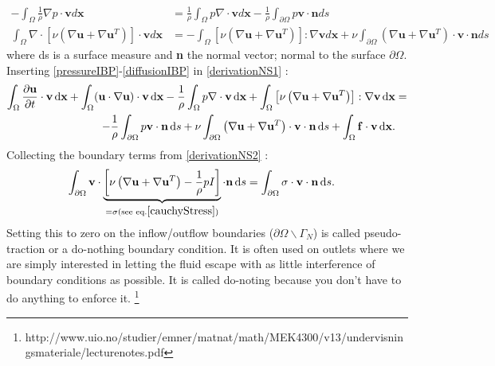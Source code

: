 \documentclass[11pt]{article}
\begin{document}
{\begin{align}
\label{pressureIBP}
-\int_\Omega \frac{1}{\rho}  \nabla p \cdot \mathbf{v} d\mathbf{x} &=
\frac{1}{\rho}\int_\Omega p\nabla \cdot \mathbf{v} d\mathbf{x} 
- \frac{1}{\rho} \int_{\partial\Omega} p \mathbf{v \cdot n} ds \\
\label{diffusionIBP}
\int_\Omega \nabla \cdot \left[\nu \left(\nabla\mathbf{u} + \nabla\mathbf{u}^T \right)  
\right] \cdot \mathbf{v} d\mathbf{x} &=
-\int_\Omega \left[\nu \left(\nabla\mathbf{u} + \nabla\mathbf{u}^T \right)  
\right] : \nabla\mathbf{v} d\mathbf{x} 
+ \nu \int_{\partial \Omega} \left(\nabla\mathbf{u} + \nabla\mathbf{u}^T \right) \cdot 
\mathbf{v} \cdot \mathbf{n} ds 
\end{align}
where ds is a surface measure and \textbf{n} the normal vector; normal to the surface 
$\partial \Omega$. Inserting \eqref{pressureIBP}-\eqref{diffusionIBP} in \eqref{derivationNS1} :
\begin{align}
\label{derivationNS2}
\int_\Omega\frac{\partial\mathbf{u}}{\partial t} \cdot \mathbf{v}\,\mathrm d\mathbf{x}
+ \int_\Omega (\mathbf{u}\cdot\nabla \mathbf{u}) \cdot \mathbf{v}\,\mathrm d\mathbf{x}
- \frac{1}{\rho}\int_\Omega  p\nabla \cdot \mathbf{v}\,\mathrm d\mathbf{x} 
+ \int_\Omega \left[\nu \left(\nabla\mathbf{u} + \nabla\mathbf{u}^T \right)  
\right] : \nabla \mathbf{v}\,\mathrm d\mathbf{x}
&=  \\ \notag
- \frac{1}{\rho} \int_{\partial\Omega} p \mathbf{v \cdot n}\,\mathrm ds
+ \nu \int_{\partial \Omega} \left(\nabla\mathbf{u} + \nabla\mathbf{u}^T \right) \cdot 
\mathbf{v} \cdot \mathbf{n}\,\mathrm ds 
+ \int_\Omega \mathbf{f} \cdot \mathbf{v}\,\mathrm d\mathbf{x}.
\end{align}
Collecting the boundary terms from \eqref{derivationNS2} :
\begin{align}
\label{weakBoundary}
\int_{\partial\Omega}
\mathbf{v} \cdot \underbrace{\left[
\nu \left(\nabla\mathbf{u} + \nabla\mathbf{u}^T \right) 
- \frac{1}{\rho} p I \right]}_{= \sigma (\text{see eq.} \eqref{cauchyStress})}
 \cdot\mathbf{n}\,\mathrm ds 
&= \int_{\partial\Omega} \mathbf{\sigma \cdot v \cdot n}\,\mathrm ds.
\end{align}
Setting this to zero on the inflow/outflow boundaries ($\partial \Omega\backslash\Gamma_N$) is 
called pseudo-traction or a do-nothing boundary condition. It is often used on outlets where we 
are simply interested in letting the fluid escape with as little interference of boundary conditions 
as possible. It is called do-noting because you don’t have to do anything to enforce it.
\footnote{ http://www.uio.no/studier/emner/matnat/math/MEK4300/v13/undervisningsmateriale/lecturenotes.pdf}

}
\end{document}
